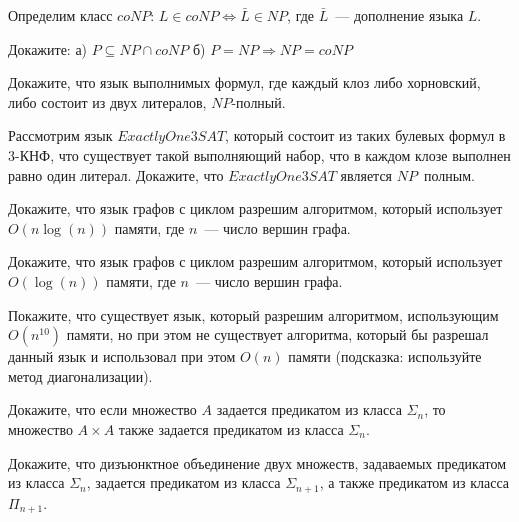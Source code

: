 \setcounter{curtask}{31}


Определим класс $coNP$: $L \in coNP \Leftrightarrow \bar{L} \in NP$, где
$\bar{L}$~--- дополнение языка $L$.


\begin{task}
	Докажите:
    а) $P \subseteq NP \cap coNP$
    б) $P = NP \Rightarrow NP = coNP$
\end{task}

\begin{task}
	Докажите, что язык выполнимых формул, где каждый клоз либо хорновский, либо состоит из двух
    литералов, $NP$-полный.
\end{task}

\begin{task}
    Рассмотрим язык $Exactly One 3SAT$, который состоит из таких булевых формул в
    $3$-КНФ, что существует такой выполняющий набор, что в каждом клозе выполнен
    равно один литерал. Докажите, что $Exactly One 3SAT$ является $NP$~полным.
\end{task}

\begin{task}
    Докажите, что язык графов с циклом разрешим алгоритмом, который использует $O(n
    \log(n))$ памяти, где $n$~--- число вершин графа.
\end{task}

\begin{task}
    Докажите, что язык графов с циклом разрешим алгоритмом, который использует
    $O(\log(n))$ памяти, где $n$~--- число вершин графа.
\end{task}


\begin{task}
    Покажите, что существует язык, который разрешим алгоритмом, использующим
    $O(n^{10})$ памяти, но при этом не существует алгоритма, который бы разрешал
    данный язык и использовал при этом $O(n)$ памяти (подсказка: используйте метод
    диагонализации).
\end{task}

\breakline


\begin{ptask}{23}
    Докажите, что если множество $A$ задается предикатом из класса $\Sigma_n$, то
    множество $A \times A$ также задается предикатом из класса $\Sigma_n$.
\end{ptask}

\begin{ptask}{24}
    Докажите, что дизъюнктное объединение двух множеств, задаваемых предикатом из
    класса $\Sigma_n$, задается предикатом из класса $\Sigma_{n + 1}$, а также
    предикатом из класса $\Pi_{n + 1}$.
\end{ptask}